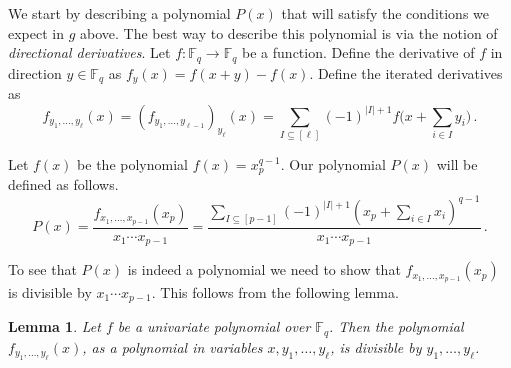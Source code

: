 \documentclass[10pt]{article}
\newtheorem{lemma}[theorem]{Lemma}
\theoremstyle{definition}
\numberwithin{equation}{section}
\newcommand{\F}{{\mathbb{F}}}
\begin{document}
We start by describing a polynomial $P(x)$ that will satisfy the conditions we expect in $g$ above. The best way to describe this polynomial is via the notion of \emph{directional derivatives}. Let $f: \F_q \to \F_q$ be a function. Define the
derivative of $f$ in direction $y \in \F_q$ as $f_y(x) = f(x+y) - f(x)$.
Define the iterated derivatives as
\[f_{y_1,\ldots,y_\ell}(x) = (f_{y_1,\ldots,y_{\ell-1}})_{y_\ell}(x) = \sum_{I \subseteq [\ell]} (-1)^{|I|+1} f\bigg(x + \sum_{i \in I}y_i\bigg) \,.\]

Let $f(x)$ be the polynomial $f(x)=x_p^{q-1}$. Our polynomial $P(x)$ will be defined as follows.
\begin{equation}\label{eq:P(x)}
P(x) = \frac {f_{x_1,\ldots,x_{p-1}}(x_p)} {x_1 \cdots x_{p-1}} =
\frac {\sum_{I \subseteq [p-1]} (-1)^{|I|+1} (x_p + \sum_{i \in I} x_i)^{q-1}} {x_1 \cdots x_{p-1}}\,.
\end{equation}

To see that $P(x)$ is indeed a polynomial we need to show that $f_{x_1,\ldots,x_{p-1}}(x_p)$ is divisible by $x_1 \cdots x_{p-1}$. 
This  follows from the following lemma.

\begin{lemma}
Let $f$ be a univariate polynomial over $\F_q$. Then the polynomial $f_{y_1,\ldots,y_{\ell}}(x)$, as a polynomial in variables $x,y_1,\ldots,y_\ell$, is divisible by $y_1,\ldots,y_{\ell}$.
\end{lemma}
\end{document}
